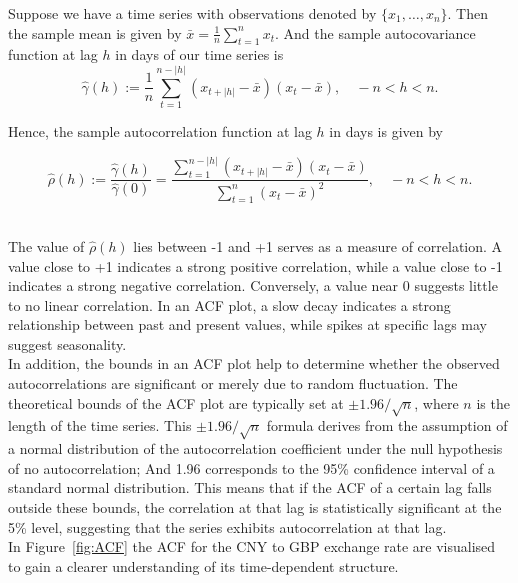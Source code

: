\documentclass{article}\usepackage[]{graphicx}\usepackage[]{xcolor}
\numberwithin{equation}{section}
\begin{document}
\noindent
Suppose we have a time series with observations denoted by \( \{x_1, \ldots, x_n \}\). Then the sample mean is given by $\bar{x} = \frac{1} {n} \sum_{t=1}^{n} x_t.$
And the sample autocovariance function \cite{Brockwell2016Introduction} at lag $h$ in days of our time series is
\[\hat{\gamma}(h) := \frac{1}{n} \sum_{t=1}^{n-|h|} (x_{t+|h|} - \bar{x})(x_t - \bar{x}), \quad -n < h < n.\]

\noindent 
Hence, the sample autocorrelation function \cite{Brockwell2016Introduction} at lag $h$ in days is given by

\[\hat{\rho}(h) := \frac{\hat{\gamma}(h)}{\hat{\gamma}(0)} = \frac{\sum_{t=1}^{n-|h|} (x_{t+|h|} - \bar{x})(x_t - \bar{x})}{\sum_{t=1}^{n} (x_t - \bar{x})^{2}}, \quad -n < h < n.\]

\\
\noindent
The value of $\hat{\rho}(h)$ lies between -1 and +1 serves as a measure of correlation. A value close to +1 indicates a strong positive correlation, while a value close to -1 indicates a strong negative correlation. Conversely, a value near 0 suggests little to no linear correlation. In an ACF plot, a slow decay indicates a strong relationship between past and present values, while spikes at specific lags may suggest seasonality.\\

\noindent 
In addition, the bounds in an ACF plot help to determine whether the observed autocorrelations are significant or merely due to random fluctuation. The theoretical bounds of the ACF plot are typically set at $\pm 1.96/\sqrt{n}$, where $n$ is the length of the time series. This $\pm 1.96/\sqrt{n}$ formula derives from the assumption of a normal distribution of the autocorrelation coefficient under the null hypothesis of no autocorrelation; And 1.96 corresponds to the 95\% confidence interval of a standard normal distribution. This means that if the ACF of a certain lag falls outside these bounds, the correlation at that lag is statistically significant at the 5\% level, suggesting that the series exhibits autocorrelation at that lag.\\

\noindent
In Figure~\ref{fig:ACF} the ACF for the CNY to GBP exchange rate are visualised to gain a clearer understanding of its time-dependent structure.
\end{document}
